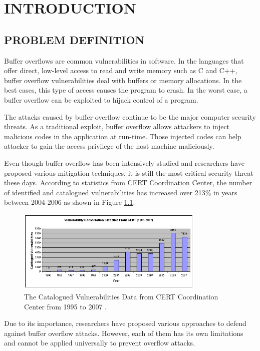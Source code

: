 \chapter{INTRODUCTION}
\section{PROBLEM DEFINITION}

Buffer overflows are common vulnerabilities in software. In the languages that offer direct, low-level access to read and write memory such as C and C++, buffer overflow vulnerabilities deal with buffers or memory allocations. In the best cases, this type of access causes the program to crash. In the worst case, a buffer overflow can be exploited to hijack control of a program.

The attacks caused by buffer overflow continue to be the major computer security threats. As a traditional exploit, buffer overflow allows attackers to inject malicious codes in the application at run-time. Those injected codes can help attacker to gain the access privilege of the host machine maliciously.

Even though buffer overflow has been intensively studied and researchers have proposed various mitigation techniques, it is still the most critical security threat these days. According to statistics from CERT Coordination Center, the number of identified and catalogued vulnerabilities has increased over 213\% in years between 2004-2006 as shown in Figure \ref{fig:1}.

\begin{figure}[!htbp]
    \centering
    \includegraphics[width=0.8\textwidth]{Imgs/1.png}
    \caption{\label{fig:1} The Catalogued Vulnerabilities Data from CERT Coordination Center from 1995 to 2007  \cite{One}.}
\end{figure}
Due to its importance, researchers have proposed various approaches to defend against buffer overflow attacks. However, each of them has its own limitations and cannot be applied universally to prevent overflow attacks. 

